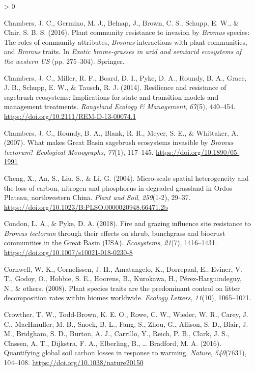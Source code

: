 \documentclass[
  11pt,
  a4paper,
]{article}
\newlength{\cslhangindent}
\newenvironment{CSLReferences}[2] %
 {%
  \setlength{\parindent}{0pt}
  \ifodd #1 \everypar{\setlength{\hangindent}{\cslhangindent}}\ignorespaces\fi
  \ifnum #2 > 0
  \setlength{\parskip}{#2\baselineskip}
  \fi
 }%
 {}
\begin{document}
\begin{CSLReferences}{1}{0}
\leavevmode\hypertarget{ref-Chambers2016}{}%
Chambers, J. C., Germino, M. J., Belnap, J., Brown, C. S., Schupp, E. W., \& Clair, S. B. S. (2016). Plant community resistance to invasion by \emph{{B}romus} species: The roles of community attributes, \emph{{B}romus} interactions with plant communities, and \emph{{B}romus} traits. In \emph{Exotic brome-grasses in arid and semiarid ecosystems of the western US} (pp. 275--304). Springer.

\leavevmode\hypertarget{ref-Chambers2014rem}{}%
Chambers, J. C., Miller, R. F., Board, D. I., Pyke, D. A., Roundy, B. A., Grace, J. B., Schupp, E. W., \& Tausch, R. J. (2014). {Resilience and resistance of sagebrush ecosystems: Implications for state and transition models and management treatments}. \emph{Rangeland Ecology \& Management}, \emph{67}(5), 440--454. \url{https://doi.org/10.2111/REM-D-13-00074.1}

\leavevmode\hypertarget{ref-Chambers2007}{}%
Chambers, J. C., Roundy, B. A., Blank, R. R., Meyer, S. E., \& Whittaker, A. (2007). {What makes Great Basin sagebrush ecosystems invasible by \emph{Bromus tectorum}?} \emph{Ecological Monographs}, \emph{77}(1), 117--145. \url{https://doi.org/10.1890/05-1991}

\leavevmode\hypertarget{ref-Cheng2004}{}%
Cheng, X., An, S., Liu, S., \& Li, G. (2004). {Micro-scale spatial heterogeneity and the loss of carbon, nitrogen and phosphorus in degraded grassland in Ordos Plateau, northwestern China}. \emph{Plant and Soil}, \emph{259}(1-2), 29--37. \url{https://doi.org/10.1023/B:PLSO.0000020948.66471.2b}

\leavevmode\hypertarget{ref-Condon2018}{}%
Condon, L. A., \& Pyke, D. A. (2018). {Fire and grazing influence site resistance to \emph{Bromus tectorum} through their effects on shrub, bunchgrass and biocrust communities in the Great Basin (USA)}. \emph{Ecosystems}, \emph{21}(7), 1416--1431. \url{https://doi.org/10.1007/s10021-018-0230-8}

\leavevmode\hypertarget{ref-Cornwell2008}{}%
Cornwell, W. K., Cornelissen, J. H., Amatangelo, K., Dorrepaal, E., Eviner, V. T., Godoy, O., Hobbie, S. E., Hoorens, B., Kurokawa, H., Pérez-Harguindeguy, N., \& others. (2008). Plant species traits are the predominant control on litter decomposition rates within biomes worldwide. \emph{Ecology Letters}, \emph{11}(10), 1065--1071.

\leavevmode\hypertarget{ref-Crowther2016}{}%
Crowther, T. W., Todd-Brown, K. E. O., Rowe, C. W., Wieder, W. R., Carey, J. C., MacHmuller, M. B., Snoek, B. L., Fang, S., Zhou, G., Allison, S. D., Blair, J. M., Bridgham, S. D., Burton, A. J., Carrillo, Y., Reich, P. B., Clark, J. S., Classen, A. T., Dijkstra, F. A., Elberling, B., \ldots{} Bradford, M. A. (2016). {Quantifying global soil carbon losses in response to warming}. \emph{Nature}, \emph{540}(7631), 104--108. \url{https://doi.org/10.1038/nature20150}


\end{CSLReferences}
\end{document}
